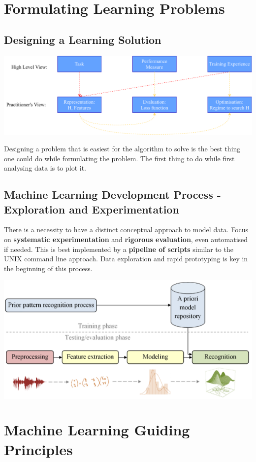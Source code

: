 \documentclass[11pt]{article}
\theoremstyle{definition}
\begin{document}
\section{Formulating Learning Problems}
\subsection{Designing a Learning Solution}
\begin{center}
	\includegraphics[width=\linewidth,keepaspectratio]{designing_learning_solution.pdf}
\end{center}

Designing a problem that is easiest for the algorithm to solve is the best thing one could do while formulating the problem. The first thing to do while first analysing data is to plot it.

\subsection{Machine Learning Development Process - Exploration and Experimentation}
There is a necessity to have a distinct conceptual approach to model data. Focus on \textbf{systematic experimentation} and \textbf{rigorous evaluation}, even automatised if needed. This is best implemented by a \textbf{pipeline of scripts} similar to the UNIX command line approach. Data exploration and rapid prototyping is key in the beginning of this process.

\begin{center}
	\includegraphics[width=0.6\linewidth]{exploration_evaluation_pipeline}
\end{center}

\section{Machine Learning Guiding Principles}
\end{document}
